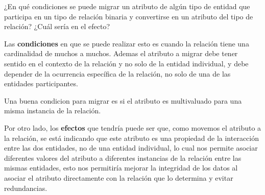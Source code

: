 ¿En qué condiciones se puede migrar un atributo de algún tipo de entidad que participa en un tipo de relación binaria y convertirse en un atributo del tipo de relación? ¿Cuál sería en el efecto?

   Las \textbf{condiciones} en que se puede realizar esto es cuando la relación tiene una cardinalidad de muchos a muchos. Ademas el atributo a migrar debe tener sentido en el contexto de la relación y no solo de la entidad individual, y debe depender de la ocurrencia específica de la relación, no solo de una de las entidades participantes. 
   
   Una buena condicion para migrar es si el atributo es multivaluado para una misma instancia de la relación.

   Por otro lado, los \textbf{efectos} que tendría puede ser que, como movemos el atributo a la relación, se está indicando que este atributo es una propiedad de la interacción entre las dos entidades, no de una entidad individual, lo cual nos permite asociar diferentes valores del atributo a diferentes instancias de la relación entre las mismas entidades, esto nos permitiría mejorar la integridad de los datos al asociar el atributo directamente con la relación que lo determina y evitar redundancias. 